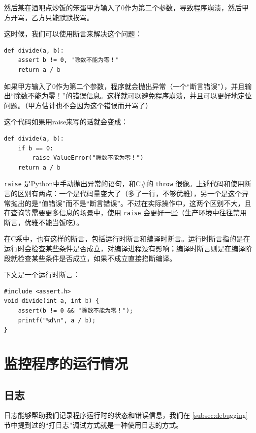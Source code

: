 然后某在酒吧点炒饭的笨蛋甲方输入了0作为第二个参数，导致程序崩溃，然后甲方开骂，乙方只能默默挨骂。

这时候，我们可以使用断言来解决这个问题：
\begin{verbatim}
def divide(a, b):
    assert b != 0, "除数不能为零！"
    return a / b
\end{verbatim}

如果甲方输入了0作为第二个参数，程序就会抛出异常（一个“断言错误”），并且输出“除数不能为零！”的错误信息。这样就可以避免程序崩溃，并且可以更好地定位问题。（甲方估计也不会因为这个错误而开骂了）

这个代码如果用raise来写的话就会变成：
\begin{verbatim}
def divide(a, b):
    if b == 0:
        raise ValueError("除数不能为零！")
    return a / b
\end{verbatim}
\texttt{raise} 是Python中手动抛出异常的语句，和C\#的 \texttt{throw} 很像。上述代码和使用断言的区别有两点：一个是代码量变大了（多了一行，不够优雅），另一个是这个异常抛出的是“值错误”而不是“断言错误”。不过在实际操作中，这两个区别不大，且在查询等需要更多信息的场景中，使用 \texttt{raise} 会更好一些（生产环境中往往禁用断言，优雅不能当饭吃）。

在C系中，也有这样的断言，包括运行时断言和编译时断言。运行时断言指的是在运行时会检查某些条件是否成立，对编译进程没有影响；编译时断言则是在编译阶段就检查某些条件是否成立，如果不成立直接掐断编译。

下文是一个运行时断言：
\begin{verbatim}
#include <assert.h>
void divide(int a, int b) {
    assert(b != 0 && "除数不能为零！");
    printf("%d\n", a / b);
}
\end{verbatim}

\section{监控程序的运行情况}\label{sec:monitoring}

\subsection{日志}\label{subsec:logging}

日志能够帮助我们记录程序运行时的状态和错误信息，我们在 \ref{subsec:debugging} 节中提到过的“打日志”调试方式就是一种使用日志的方式。


